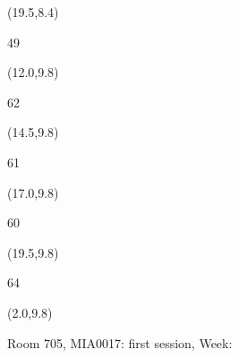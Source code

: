\documentclass[a4paper]{article}
\newcommand{\myseat}[4]{%
\vspace{-0.1cm} \hspace{-0.5cm}
\parbox[t][2.2cm][t]{3.5cm}{%
\small #1 %
\begin{description}
\vspace{-0.1cm}
\item [ID:] #2
\vspace{-0.1cm}
\item [Team:] #3 \normalsize
\vspace{-0.1cm}
\item \normalsize #4
\vspace{-0.1cm}
\end{description}
}
}
\begin{document}
\begin{CJK}{UTF8}{cyberbit}
\begin{textblock}{2.5}(19.5,8.4)
\textblockcolor{}
\myseat{49}{}{}{}
\end{textblock}


\begin{textblock}{2.5}(12.0,9.8)
\textblockcolor{}
\myseat{62}{}{}{}
\end{textblock}

\begin{textblock}{2.5}(14.5,9.8)
\textblockcolor{}
\myseat{61}{}{}{}
\end{textblock}

\begin{textblock}{2.5}(17.0,9.8)
\textblockcolor{}
\myseat{60}{}{}{}
\end{textblock}

\begin{textblock}{2.5}(19.5,9.8)
\textblockcolor{}
\myseat{64}{}{}{}
\end{textblock}

\begin{textblock}{10}(2.0,9.8)
\textblockcolor{}
\parbox[t][2.2cm][t]{9.5cm}{%
\large Room 705, MIA0017: first session, Week: 
\vspace{-0.3cm} \hspace{-0.5cm}
}
\end{textblock}

\end{CJK}
\end{document}

